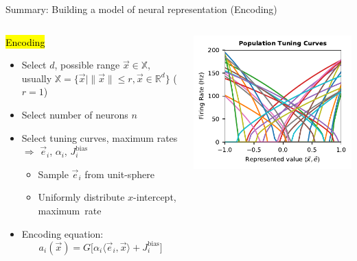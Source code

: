 \documentclass[handout,aspectratio=169]{beamer}
\begin{document}
\begin{frame}{Summary: Building a model of neural representation (Encoding)}
	\begin{columns}[c]
		\begin{block}{\hl{Encoding}}
		\begin{itemize}
			\setlength{\itemsep}{0.25cm}
			\item Select $d$, possible range $\vec x \in \mathbb{X}$, usually $\mathbb{X} = \big\{ \vec x \mid \| \vec x \| \leq r, \vec x \in \mathbb{R}^d \big\}$ ($r = 1$)
			\item Select number of neurons $n$
			\item Select tuning curves, maximum rates\\$\Rightarrow$ $\vec e_i$, $\alpha_i$, $J^\mathrm{bias}_i$\\[0.125cm]
			\begin{itemize}
				\setlength{\itemsep}{0.125cm}
				\item Sample $\vec e_i$ from unit-sphere
				\item Uniformly distribute $x$-intercept, maximum~rate
			\end{itemize}
			\item Encoding equation:\vspace{-0.25cm}
			$$a_i(\vec x) = G\big[ \alpha_i \langle \vec e_i, \vec x \rangle + J^\mathrm{bias}_i\big]$$
		\end{itemize}
		\end{block}
		\includegraphics{media/tuning_curves.pdf}
	\end{columns}
\end{frame}
\end{document}
